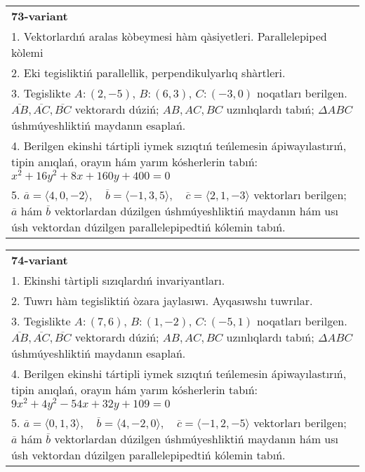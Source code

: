 \documentclass{article}
\begin{document}
\begin{tabular}{m{17cm}}
\textbf{73-variant}\\
1. Vektorlardıń aralas kòbeymesi hàm qàsiyetleri. Parallelepiped kòlemi\\

2. Eki tegisliktiń parallellik, perpendikulyarlıq shàrtleri.\\

3. Tegislikte $A: (2, -5)$, $B: (6, 3)$, $C: (-3, 0)$ noqatları berilgen. $\overline{AB}, \overline{AC}, \overline{BC}$ vektorardı dúziń; $AB, AC, BC$ uzınlıqlardı tabıń; $\Delta ABC$ úshmúyeshliktiń maydanın esaplań. \\

4. Berilgen ekinshi tártipli iymek sızıqtıń teńlemesin ápiwayılastırıń, tipin anıqlań, orayın hám yarım kósherlerin tabıń: $x^2+16y^2+8x+160y+400=0$\\

5. \(\overline{a} = \langle 4, 0, -2 \rangle, \quad \overline{b} = \langle -1, 3, 5 \rangle, \quad \overline{c} = \langle 2, 1, -3 \rangle\) vektorları berilgen; \(\overline{a}\) hám \(\overline{b}\) vektorlardan dúzilgen úshmúyeshliktiń maydanın hám usı úsh vektordan dúzilgen parallelepipedtiń kólemin tabıń.
\end{tabular}
\vspace{1cm}


\begin{tabular}{m{17cm}}
\textbf{74-variant}\\
1. Ekinshi tàrtipli sızıqlardıń invariyantları.\\

2. Tuwrı hàm tegisliktiń òzara jaylasıwı. Ayqasıwshı tuwrılar.\\

3. Tegislikte $A: (7, 6)$, $B: (1, -2)$, $C: (-5, 1)$ noqatları berilgen. $\overline{AB}, \overline{AC}, \overline{BC}$ vektorardı dúziń; $AB, AC, BC$ uzınlıqlardı tabıń; $\Delta ABC$ úshmúyeshliktiń maydanın esaplań. \\

4. Berilgen ekinshi tártipli iymek sızıqtıń teńlemesin ápiwayılastırıń, tipin anıqlań, orayın hám yarım kósherlerin tabıń: $9x^2+4y^2-54x+32y+109=0$\\

5. \(\overline{a} = \langle 0, 1, 3 \rangle, \quad \overline{b} = \langle 4, -2, 0 \rangle, \quad \overline{c} = \langle -1, 2, -5 \rangle\) vektorları berilgen; \(\overline{a}\) hám \(\overline{b}\) vektorlardan dúzilgen úshmúyeshliktiń maydanın hám usı úsh vektordan dúzilgen parallelepipedtiń kólemin tabıń.
\end{tabular}
\vspace{1cm}
\end{document}
